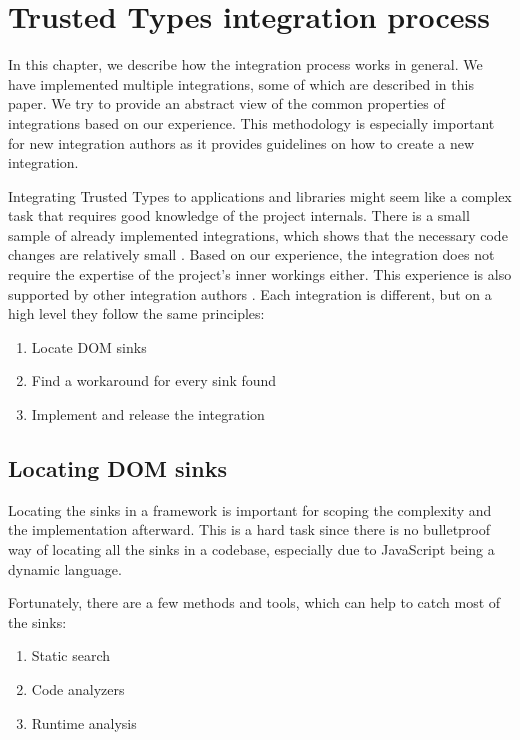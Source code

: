 \chapter{Trusted Types integration process}
\label{tt_integration_setup}

In this chapter, we describe how the integration process works in general. We have implemented
multiple integrations, some of which are described in this paper. We try to provide an abstract view
of the common properties of integrations based on our experience. This methodology is especially
important for new integration authors as it provides guidelines on how to create a new integration.

Integrating Trusted Types to applications and libraries might seem like a complex task that requires
good knowledge of the project internals. There is a small sample of already implemented
integrations, which shows that the necessary code changes are relatively small
\cite{tt_integration_list}. Based on our experience, the integration does not require the expertise
of the project's inner workings either. This experience is also supported by other integration
authors \cite{tt_web_framework_paper}. Each integration is different, but on a high level they
follow the same principles:

\begin{enumerate}
  \item Locate DOM sinks
  \item Find a workaround for every sink found
  \item Implement and release the integration
\end{enumerate}

\section{Locating DOM sinks}

Locating the sinks in a framework is important for scoping the complexity and the implementation
afterward. This is a hard task since there is no bulletproof way of locating all the sinks in a
codebase, especially due to JavaScript being a dynamic language.

\vspace{25mm}

Fortunately, there are a few methods and tools, which can help to catch most of the sinks:

\begin{enumerate}
  \item Static search
  \item Code analyzers
  \item Runtime analysis
\end{enumerate}


